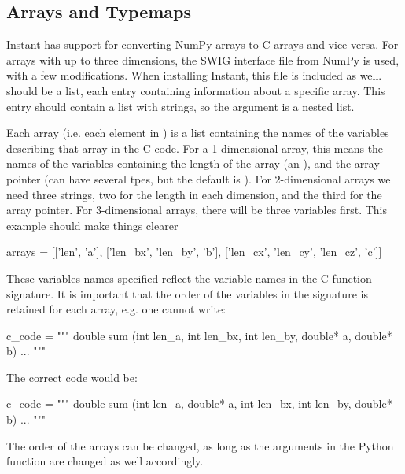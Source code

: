 \subsection{Arrays and Typemaps}\label{arrays}
Instant has support for converting NumPy arrays to C arrays and vice
versa. For arrays with up to three dimensions, the SWIG interface file from
NumPy is used, with a few modifications. When installing Instant, this file is
included as well.  should be a list, each entry containing
information about a specific array. This entry should contain a list with
strings, so the  argument is a nested list.

Each array (i.e. each element in ) is a list containing the names
of the variables describing that array in the C code. For a 1-dimensional
array, this means the names of the variables containing the length of the
array (an ), and the array pointer (can have several tpes, but the
default is ). For 2-dimensional arrays we need three strings, two
for the length in each dimension, and the third for the array pointer. For
3-dimensional arrays, there will be three variables first. This example should
make things clearer
\begin{code}
arrays = [['len', 'a'],
          ['len_bx', 'len_by', 'b'],
          ['len_cx', 'len_cy', 'len_cz', 'c']]
\end{code}
These variables names specified reflect the variable names in the C function
signature. It is important that the order of the variables in the signature is
retained for each array, e.g. one cannot write:
\begin{code}
c_code = """
double sum (int len_a, int len_bx, int len_by, double* a, double* b){
  ...
}
"""
\end{code}
The correct code would be:
\begin{code}
c_code = """
double sum (int len_a, double* a, int len_bx, int len_by, double* b){
  ...
}
"""
\end{code}
The order of the arrays can be changed, as long as the arguments in the Python
function are changed as well accordingly.

